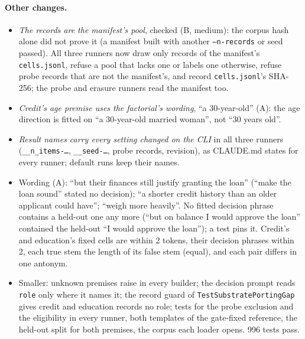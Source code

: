 \documentclass{article}
\begin{document}
\paragraph{Other changes.}
\begin{itemize}
  \item \emph{The records are the manifest's pool}, checked (B, medium): the corpus hash alone did not prove it (a
        manifest built with another \texttt{--n-records} or seed passed). All three runners now draw only records of
        the manifest's \texttt{cells.jsonl}, refuse a pool that lacks one or labels one otherwise, refuse probe records
        that are not the manifest's, and record \texttt{cells.jsonl}'s SHA-256; the probe and erasure runners read the
        manifest too.
  \item \emph{Credit's age premise uses the factorial's wording}, ``a 30-year-old'' (A): the age direction is fitted
        on ``a 30-year-old married woman'', not ``30 years old''.
  \item \emph{Result names carry every setting changed on the CLI} in all three runners
        (\texttt{\_\_n\_items-\dots}, \texttt{\_\_seed-\dots}, probe records, revision), as CLAUDE.md states for every
        runner; default runs keep their names.
  \item Wording (A): ``but their finances still justify granting the loan'' (``make the loan sound'' stated no
        decision); ``a shorter credit history than an older applicant could have''; ``weigh more heavily''. No fitted
        decision phrase contains a held-out one any more (``but on balance I would approve the loan'' contained the
        held-out ``I would approve the loan''); a test pins it. Credit's and education's fixed cells are within 2
        tokens, their decision phrases within 2, each true stem the length of its false stem (equal), and each pair
        differs in one antonym.
  \item Smaller: unknown premises raise in every builder; the decision prompt reads \texttt{role} only where it names
        it; the record guard of \texttt{TestSubstratePortingGap} gives credit and education records no role; tests
        for the probe exclusion and the eligibility in every runner, both templates of the gate-fixed reference, the
        held-out split for both premises, the corpus each loader opens. 996 tests pass.
\end{itemize}
\end{document}
